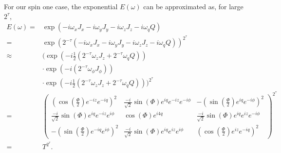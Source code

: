 \documentclass{jors}
\begin{document}
		For our spin one case, the exponential \(E(\omega)\) can be approximated as, for large \(2^\tau\),
		\begin{align}
			E(\omega) =& \exp\left(-i\omega_x J_x - i\omega_y J_y - i\omega_z J_z - i\omega_q Q\right)\\
			=& \exp\left(2^{-\tau}\left(-i\omega_x J_x - i\omega_y J_y - i\omega_z J_z - i\omega_q Q\right)\right)^{2^\tau}\\
			\approx& \biggl(\exp\left(-i\frac12\left(2^{-\tau} \omega_z J_z + 2^{-\tau}\omega_q Q\right)\right)\nonumber\\
			&\cdot\exp\left(-i\left(2^{-\tau} \omega_\phi J_\phi\right)\right)\nonumber\\
			&\cdot\exp\left(-i\frac12\left(2^{-\tau} \omega_z J_z + 2^{-\tau} \omega_q Q\right)\right)\biggr)^{2^\tau}\\
			=& \begin{pmatrix}
				\left(\cos\left(\frac{\Phi}{2}\right) e^{-iz}e^{-iq}\right)^2 & \frac{-i}{\sqrt{2}} \sin(\Phi)e^{iq}e^{-iz}e^{-i\phi} & -\left(\sin\left(\frac{\Phi}{2}\right)e^{iq}e^{-i\phi}\right)^2\\
				\frac{-i}{\sqrt{2}} \sin(\Phi)e^{iq}e^{-iz}e^{i\phi} & \cos(\Phi)e^{i4q} & \frac{-i}{\sqrt{2}} \sin(\Phi)e^{iq}e^{iz}e^{-i\phi}\\
				-\left(\sin\left(\frac{\Phi}{2}\right)e^{-iq}e^{i\phi}\right)^2 & \frac{-i}{\sqrt{2}} \sin(\Phi)e^{iq}e^{iz}e^{i\phi} & \left(\cos\left(\frac{\Phi}{2}\right) e^{iz}e^{-iq}\right)^2
			\end{pmatrix}^{2^\tau}\\
			=& T^{2^\tau}.
		\end{align}
\end{document}
